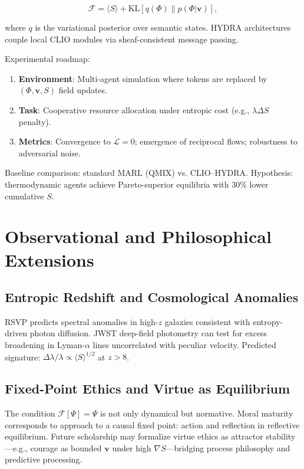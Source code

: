 \documentclass[12pt,a4paper]{article}
\begin{document}
\begin{equation}
\mathcal{F} = \langle S \rangle + \text{KL}[q(\Phi) \| p(\Phi|\bm{v})],
\end{equation}

where $q$ is the variational posterior over semantic states. HYDRA architectures couple local CLIO modules via sheaf-consistent message passing.

Experimental roadmap:
\begin{enumerate}
\item \textbf{Environment}: Multi-agent simulation where tokens are replaced by $(\Phi, \bm{v}, S)$ field updates.
\item \textbf{Task}: Cooperative resource allocation under entropic cost (e.g., $\lambda \Delta S$ penalty).
\item \textbf{Metrics}: Convergence to $\dot{\mathcal{L}} = 0$; emergence of reciprocal flows; robustness to adversarial noise.
\end{enumerate}

Baseline comparison: standard MARL (QMIX) vs. CLIO--HYDRA. Hypothesis: thermodynamic agents achieve Pareto-superior equilibria with 30\% lower cumulative $S$.

\section{Observational and Philosophical Extensions}

\subsection{Entropic Redshift and Cosmological Anomalies}

RSVP predicts spectral anomalies in high-$z$ galaxies consistent with entropy-driven photon diffusion. JWST deep-field photometry can test for excess broadening in Lyman-$\alpha$ lines uncorrelated with peculiar velocity. Predicted signature: $\Delta\lambda / \lambda \propto \langle S \rangle^{1/2}$ at $z > 8$.

\subsection{Fixed-Point Ethics and Virtue as Equilibrium}

The condition $\mathcal{F}[\Psi] = \Psi$ is not only dynamical but normative. Moral maturity corresponds to approach to a causal fixed point: action and reflection in reflective equilibrium. Future scholarship may formalize virtue ethics as attractor stability—e.g., courage as bounded $\bm{v}$ under high $\nabla S$—bridging process philosophy \cite{whitehead1929process} and predictive processing.
\end{document}
